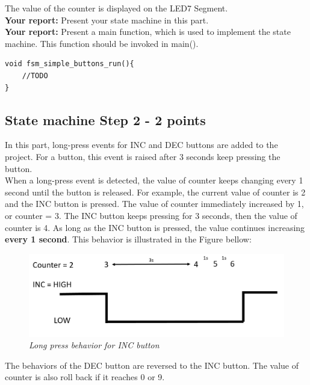 The value of the counter is displayed on the LED7 Segment.\\

\textbf{Your report: } Present your state machine in this part.\\

\textbf{Your report: } Present a main function, which is used to implement the state machine. This function should be invoked in main().

\begin{lstlisting}[caption=Implementation of the state machine]
void fsm_simple_buttons_run(){
    //TODO
}
\end{lstlisting}

\subsection{State machine Step 2 - 2 points}
In this part, long-press events for INC and DEC buttons are added to the project. For a button, this event is raised after 3 seconds keep pressing the button.\\

When a long-press event is detected, the value of counter keeps changing every 1 second until the button is released. For example, the current value of counter is 2 and the INC button is pressed. The value of counter immediately increased by 1,  or counter = 3. The INC button keeps pressing for 3 seconds, then the value of counter is 4. As long as the INC button is pressed, the value continues increasing \textbf{every 1 second}. This behavior is illustrated in the Figure bellow:

\begin{figure}[!htp]
    \centering
    \includegraphics[width=5in]{source/picture/midterm/inclongpress.PNG}
    \caption{\textit{Long press behavior for INC button}}
    \label{longpress}
\end{figure}

The behaviors of the DEC button are reversed to the INC button. The value of counter is also roll back if it reaches 0 or 9.\\

